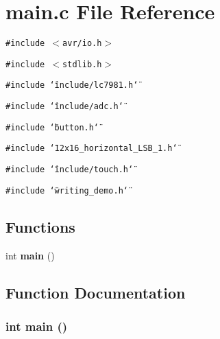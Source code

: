 \section{main.c File Reference}
\label{main_8c}
{\tt \#include $<$avr/io.h$>$}\par
{\tt \#include $<$stdlib.h$>$}\par
{\tt \#include \char`\"{}include/lc7981.h\char`\"{}}\par
{\tt \#include \char`\"{}include/adc.h\char`\"{}}\par
{\tt \#include \char`\"{}button.h\char`\"{}}\par
{\tt \#include \char`\"{}12x16\_\-horizontal\_\-LSB\_\-1.h\char`\"{}}\par
{\tt \#include \char`\"{}include/touch.h\char`\"{}}\par
{\tt \#include \char`\"{}writing\_\-demo.h\char`\"{}}\par
\subsection*{Functions}
\begin{CompactItemize}
\item 
int {\bf main} ()
\end{CompactItemize}


\subsection{Function Documentation}
\subsubsection{\setlength{\rightskip}{0pt plus 5cm}int main ()}\label{main_8c_e66f6b31b5ad750f1fe042a706a4e3d4}


